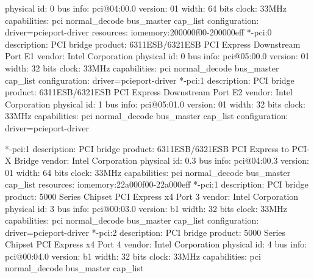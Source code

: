 \documentclass[mingoth,a4paper]{jsarticle}
\begin{document}
{{{{{{\begin{commandline}
                physical id: 0
                bus info: pci@04:00.0
                version: 01
                width: 64 bits
                clock: 33MHz
                capabilities: pci normal_decode bus_master cap_list
                configuration: driver=pcieport-driver
                resources: iomemory:200000f00-200000eff
              *-pci:0
                   description: PCI bridge
                   product: 6311ESB/6321ESB PCI Express Downstream Port E1
                   vendor: Intel Corporation
                   physical id: 0
                   bus info: pci@05:00.0
                   version: 01
                   width: 32 bits
                   clock: 33MHz
                   capabilities: pci normal_decode bus_master cap_list
                   configuration: driver=pcieport-driver
              *-pci:1
                   description: PCI bridge
                   product: 6311ESB/6321ESB PCI Express Downstream Port E2
                   vendor: Intel Corporation
                   physical id: 1
                   bus info: pci@05:01.0
                   version: 01
                   width: 32 bits
                   clock: 33MHz
                   capabilities: pci normal_decode bus_master cap_list
                   configuration: driver=pcieport-driver
\end{commandline}
\begin{commandline}
           *-pci:1
                description: PCI bridge
                product: 6311ESB/6321ESB PCI Express to PCI-X Bridge
                vendor: Intel Corporation
                physical id: 0.3
                bus info: pci@04:00.3
                version: 01
                width: 64 bits
                clock: 33MHz
                capabilities: pci normal_decode bus_master cap_list
                resources: iomemory:22a000f00-22a000eff
        *-pci:1
             description: PCI bridge
             product: 5000 Series Chipset PCI Express x4 Port 3
             vendor: Intel Corporation
             physical id: 3
             bus info: pci@00:03.0
             version: b1
             width: 32 bits
             clock: 33MHz
             capabilities: pci normal_decode bus_master cap_list
             configuration: driver=pcieport-driver
        *-pci:2
             description: PCI bridge
             product: 5000 Series Chipset PCI Express x4 Port 4
             vendor: Intel Corporation
             physical id: 4
             bus info: pci@00:04.0
             version: b1
             width: 32 bits
             clock: 33MHz
             capabilities: pci normal_decode bus_master cap_list

\end{commandline}}}}}}}
\end{document}
